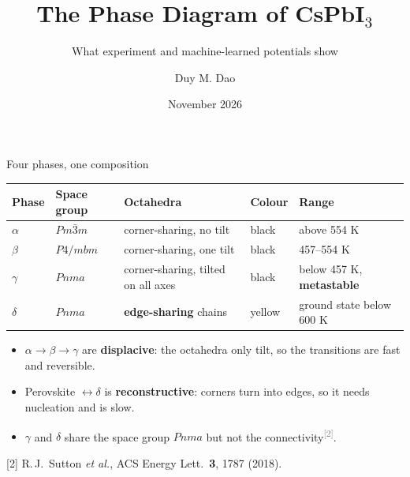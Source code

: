 \documentclass[aspectratio=169,10pt]{beamer}
\title{The Phase Diagram of CsPbI$_3$}
\subtitle{What experiment and machine-learned potentials show}
\author{Duy M. Dao}
\institute{School of Materials Science and Engineering, Tsinghua University}
\date{November 2026}
\newcommand{\cit}[1]{\textsuperscript{\textcolor{gray}{[#1]}}}
\newcommand{\refs}[1]{\par\vfill\begingroup\tiny\color{gray}\raggedright #1\par\endgroup}
\newcommand{\RB}{[2] R.\,J.~Sutton \emph{et al.}, ACS Energy Lett.\ \textbf{3}, 1787 (2018).}
\begin{document}
\maketitle

\begin{frame}{Four phases, one composition}
  \centering\small
  \begin{tabular}{lllll}
    \toprule
    Phase & Space group & Octahedra & Colour & Range \\
    \midrule
    $\alpha$ & $Pm\bar{3}m$ & corner-sharing, no tilt & black & above 554 K \\
    $\beta$ & $P4/mbm$ & corner-sharing, one tilt & black & 457--554 K \\
    $\gamma$ & $Pnma$ & corner-sharing, tilted on all axes & black & below 457 K, \textbf{metastable} \\
    $\delta$ & $Pnma$ & \textbf{edge-sharing} chains & yellow & ground state below 600 K \\
    \bottomrule
  \end{tabular}

  \vspace{0.6em}
  \raggedright
  \begin{itemize}
    \item $\alpha\rightarrow\beta\rightarrow\gamma$ are \textbf{displacive}: the octahedra only tilt, so the transitions are fast and reversible.
    \item Perovskite $\leftrightarrow\delta$ is \textbf{reconstructive}: corners turn into edges, so it needs nucleation and is slow.
    \item $\gamma$ and $\delta$ share the space group $Pnma$ but not the connectivity\cit{2}.
  \end{itemize}
  \refs{\RB}
\end{frame}
\end{document}

